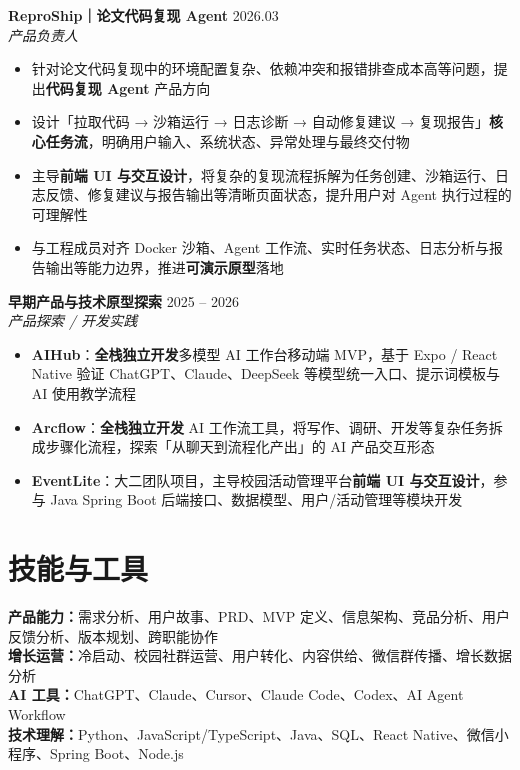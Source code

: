 \documentclass[a4paper,10pt]{article}
\newcommand{\projectentry}[3]{
  \textbf{#1} \hfill \textcolor{secondary}{\small #2} \\
  \textit{\small #3}
}
\begin{document}
\vspace{0.18em}
\projectentry{ReproShip｜论文代码复现 Agent}{2026.03}{产品负责人}
\begin{itemize}
    \item 针对论文代码复现中的环境配置复杂、依赖冲突和报错排查成本高等问题，提出\textbf{代码复现 Agent} 产品方向
    \item 设计「拉取代码 → 沙箱运行 → 日志诊断 → 自动修复建议 → 复现报告」\textbf{核心任务流}，明确用户输入、系统状态、异常处理与最终交付物
    \item 主导\textbf{前端 UI 与交互设计}，将复杂的复现流程拆解为任务创建、沙箱运行、日志反馈、修复建议与报告输出等清晰页面状态，提升用户对 Agent 执行过程的可理解性
    \item 与工程成员对齐 Docker 沙箱、Agent 工作流、实时任务状态、日志分析与报告输出等能力边界，推进\textbf{可演示原型}落地
\end{itemize}

\vspace{0.18em}
\projectentry{早期产品与技术原型探索}{2025 -- 2026}{产品探索 / 开发实践}
\begin{itemize}
    \item \textbf{AIHub}：\textbf{全栈独立开发}多模型 AI 工作台移动端 MVP，基于 Expo / React Native 验证 ChatGPT、Claude、DeepSeek 等模型统一入口、提示词模板与 AI 使用教学流程
    \item \textbf{Arcflow}：\textbf{全栈独立开发} AI 工作流工具，将写作、调研、开发等复杂任务拆成步骤化流程，探索「从聊天到流程化产出」的 AI 产品交互形态
    \item \textbf{EventLite}：大二团队项目，主导校园活动管理平台\textbf{前端 UI 与交互设计}，参与 Java Spring Boot 后端接口、数据模型、用户/活动管理等模块开发
\end{itemize}

\section{技能与工具}
{\color{primary}\textbf{产品能力：}}\hspace{0.15em}需求分析、用户故事、PRD、MVP 定义、信息架构、竞品分析、用户反馈分析、版本规划、跨职能协作\\[0.4em]
{\color{primary}\textbf{增长运营：}}\hspace{0.15em}冷启动、校园社群运营、用户转化、内容供给、微信群传播、增长数据分析\\[0.4em]
{\color{primary}\textbf{AI 工具：}}\hspace{0.15em}ChatGPT、Claude、Cursor、Claude Code、Codex、AI Agent Workflow\\[0.4em]
{\color{primary}\textbf{技术理解：}}\hspace{0.15em}Python、JavaScript/TypeScript、Java、SQL、React Native、微信小程序、Spring Boot、Node.js
\end{document}
